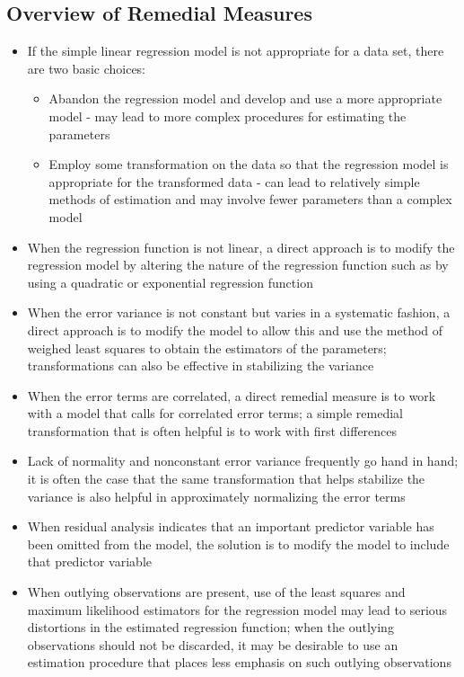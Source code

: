 \subsection{Overview of Remedial Measures}
\begin{itemize}
\item If the simple linear regression model is not appropriate for a data set, there are two basic choices: \begin{itemize} 
\item Abandon the regression model and develop and use a more appropriate model - may lead to more complex procedures for estimating the parameters 
\item Employ some transformation on the data so that the regression model is appropriate for the transformed data - can lead to relatively simple methods of estimation and may involve fewer parameters than a complex model \end{itemize} 
\item When the regression function is not linear, a direct approach is to modify the regression model by altering the nature of the regression function such as by using a quadratic or exponential regression function 
\item When the error variance is not constant but varies in a systematic fashion, a direct approach is to modify the model to allow this and use the method of weighed least squares to obtain the estimators of the parameters; transformations can also be effective in stabilizing the variance 
\item When the error terms are correlated, a direct remedial measure is to work with a model that calls for correlated error terms; a simple remedial transformation that is often helpful is to work with first differences 
\item Lack of normality and nonconstant error variance frequently go hand in hand; it is often the case that the same transformation that helps stabilize the variance is also helpful in approximately normalizing the error terms 
\item When residual analysis indicates that an important predictor variable has been omitted from the model, the solution is to modify the model to include that predictor variable 
\item When outlying observations are present, use of the least squares and maximum likelihood estimators for the regression model may lead to serious distortions in the estimated regression function; when the outlying observations should not be discarded, it may be desirable to use an estimation procedure that places less emphasis on such outlying observations
\end{itemize} 

